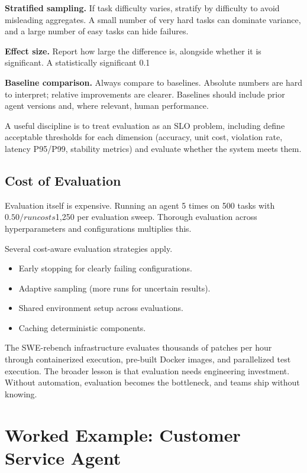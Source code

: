 \textbf{Stratified sampling.} If task difficulty varies, stratify by difficulty to avoid misleading aggregates. A small number of very hard tasks can dominate variance, and a large number of easy tasks can hide failures.

\textbf{Effect size.} Report how large the difference is, alongside whether it is significant. A statistically significant 0.1%

\textbf{Baseline comparison.} Always compare to baselines. Absolute numbers are hard to interpret; relative improvements are clearer. Baselines should include prior agent versions and, where relevant, human performance.

A useful discipline is to treat evaluation as an SLO problem, including define acceptable thresholds for each dimension (accuracy, unit cost, violation rate, latency P95/P99, stability metrics) and evaluate whether the system meets them.

\subsection{Cost of Evaluation}

Evaluation itself is expensive. Running an agent 5 times on 500 tasks with $0.50/run costs $1,250 per evaluation sweep. Thorough evaluation across hyperparameters and configurations multiplies this.

Several cost-aware evaluation strategies apply.
\begin{itemize}
\item Early stopping for clearly failing configurations.
\item Adaptive sampling (more runs for uncertain results).
\item Shared environment setup across evaluations.
\item Caching deterministic components.
\end{itemize}

The SWE-rebench infrastructure \cite{swebenchinfra2025} evaluates thousands of patches per hour through containerized execution, pre-built Docker images, and parallelized test execution. The broader lesson is that evaluation needs engineering investment. Without automation, evaluation becomes the bottleneck, and teams ship without knowing.

\section{Worked Example: Customer Service Agent}

